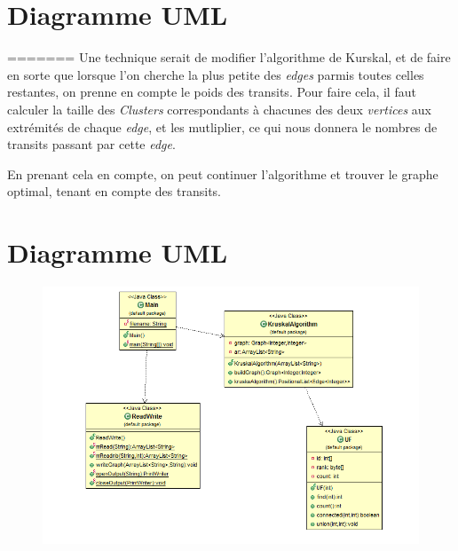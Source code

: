\documentclass[a4paper]{article}
\begin{document}
\section*{Diagramme UML}
=======
Une technique serait de modifier l'algorithme de Kurskal, et de faire en sorte que lorsque l'on cherche la plus petite des \textit{edges} parmis toutes celles restantes, on prenne en compte le poids des transits. Pour faire cela, il faut calculer la taille des \textit{Clusters} correspondants à chacunes des deux \textit{vertices} aux extrémités de chaque \textit{edge}, et les mutliplier, ce qui nous donnera le nombres de transits passant par cette \textit{edge}.

En prenant cela en compte, on peut continuer l'algorithme et trouver le graphe optimal, tenant en compte des transits.


\section*{Diagramme UML}
\begin{figure}[b]
   \includegraphics[scale=0.4]{UML.png}
\end{figure}
\end{document}
